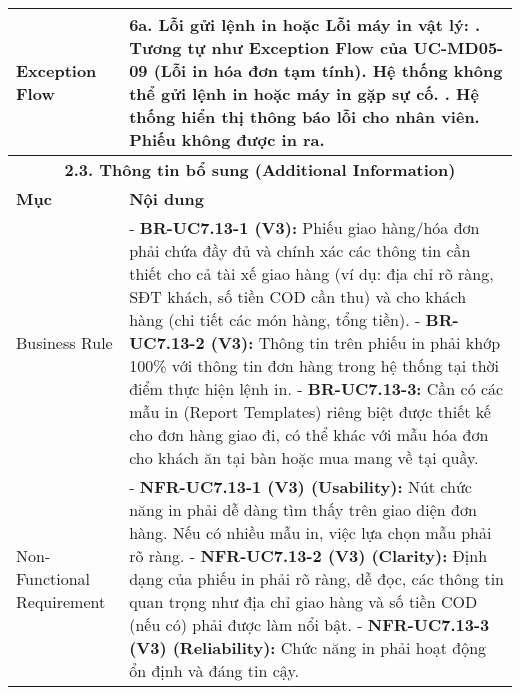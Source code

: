 \begin{longtable}{|m{4cm}|p{11cm}|}
\hline
Exception Flow & \textbf{6a. Lỗi gửi lệnh in hoặc Lỗi máy in vật lý:} \newline    1. Tương tự như Exception Flow của UC-MD05-09 (Lỗi in hóa đơn tạm tính). Hệ thống không thể gửi lệnh in hoặc máy in gặp sự cố. \newline    2. Hệ thống hiển thị thông báo lỗi cho nhân viên. Phiếu không được in ra. \\
\hline
\multicolumn{2}{|c|}{\textbf{2.3. Thông tin bổ sung (Additional Information)}} \\
\hline
\textbf{Mục} & \textbf{Nội dung} \\
\hline
Business Rule & - \textbf{BR-UC7.13-1 (V3):} Phiếu giao hàng/hóa đơn phải chứa đầy đủ và chính xác các thông tin cần thiết cho cả tài xế giao hàng (ví dụ: địa chỉ rõ ràng, SĐT khách, số tiền COD cần thu) và cho khách hàng (chi tiết các món hàng, tổng tiền). \newline - \textbf{BR-UC7.13-2 (V3):} Thông tin trên phiếu in phải khớp 100\% với thông tin đơn hàng trong hệ thống tại thời điểm thực hiện lệnh in. \newline - \textbf{BR-UC7.13-3:} Cần có các mẫu in (Report Templates) riêng biệt được thiết kế cho đơn hàng giao đi, có thể khác với mẫu hóa đơn cho khách ăn tại bàn hoặc mua mang về tại quầy. \\
\hline
Non-Functional Requirement & - \textbf{NFR-UC7.13-1 (V3) (Usability):} Nút chức năng in phải dễ dàng tìm thấy trên giao diện đơn hàng. Nếu có nhiều mẫu in, việc lựa chọn mẫu phải rõ ràng. \newline - \textbf{NFR-UC7.13-2 (V3) (Clarity):} Định dạng của phiếu in phải rõ ràng, dễ đọc, các thông tin quan trọng như địa chỉ giao hàng và số tiền COD (nếu có) phải được làm nổi bật. \newline - \textbf{NFR-UC7.13-3 (V3) (Reliability):} Chức năng in phải hoạt động ổn định và đáng tin cậy. \\
\hline
\end{longtable}

